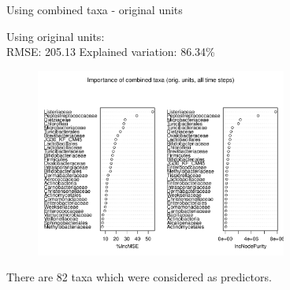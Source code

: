 \documentclass{beamer}
\begin{document}
\begin{frame}{Using combined taxa - original units}

  {\scriptsize
    
  \noindent Using original units:\\
  RMSE: 205.13  \hspace{0.05in}  Explained variation: 86.34\%

  \begin{center}
    \begin{figure}
      \includegraphics[width=3.25in]{../all_together/all_time_steps/orig_units_all_data_combined_imp_plot}
    \end{figure}
  \end{center}
  \vspace{-0.25in}

\noindent There are 82 taxa which were considered as predictors.
}

\end{frame}
\end{document}
